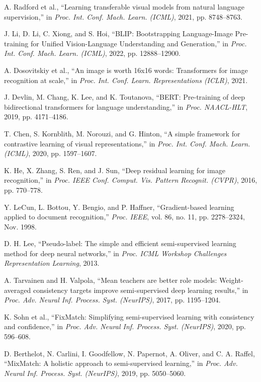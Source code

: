 \documentclass{ieeeaccess}
\begin{document}
\begin{thebibliography}{00}
 A. Radford et al., ``Learning transferable visual models from natural language supervision,'' in \emph{Proc. Int. Conf. Mach. Learn. (ICML)}, 2021, pp. 8748--8763.

 J. Li, D. Li, C. Xiong, and S. Hoi, ``BLIP: Bootstrapping Language-Image Pre-training for Unified Vision-Language Understanding and Generation,'' in \emph{Proc. Int. Conf. Mach. Learn. (ICML)}, 2022, pp. 12888--12900.

 A. Dosovitskiy et al., ``An image is worth 16x16 words: Transformers for image recognition at scale,'' in \emph{Proc. Int. Conf. Learn. Representations (ICLR)}, 2021.

 J. Devlin, M. Chang, K. Lee, and K. Toutanova, ``BERT: Pre-training of deep bidirectional transformers for language understanding,'' in \emph{Proc. NAACL-HLT}, 2019, pp. 4171--4186.

 T. Chen, S. Kornblith, M. Norouzi, and G. Hinton, ``A simple framework for contrastive learning of visual representations,'' in \emph{Proc. Int. Conf. Mach. Learn. (ICML)}, 2020, pp. 1597--1607.

 K. He, X. Zhang, S. Ren, and J. Sun, ``Deep residual learning for image recognition,'' in \emph{Proc. IEEE Conf. Comput. Vis. Pattern Recognit. (CVPR)}, 2016, pp. 770--778.

 Y. LeCun, L. Bottou, Y. Bengio, and P. Haffner, ``Gradient-based learning applied to document recognition,'' \emph{Proc. IEEE}, vol. 86, no. 11, pp. 2278--2324, Nov. 1998.

 D. H. Lee, ``Pseudo-label: The simple and efficient semi-supervised learning method for deep neural networks,'' in \emph{Proc. ICML Workshop Challenges Representation Learning}, 2013.

 A. Tarvainen and H. Valpola, ``Mean teachers are better role models: Weight-averaged consistency targets improve semi-supervised deep learning results,'' in \emph{Proc. Adv. Neural Inf. Process. Syst. (NeurIPS)}, 2017, pp. 1195--1204.

 K. Sohn et al., ``FixMatch: Simplifying semi-supervised learning with consistency and confidence,'' in \emph{Proc. Adv. Neural Inf. Process. Syst. (NeurIPS)}, 2020, pp. 596--608.

 D. Berthelot, N. Carlini, I. Goodfellow, N. Papernot, A. Oliver, and C. A. Raffel, ``MixMatch: A holistic approach to semi-supervised learning,'' in \emph{Proc. Adv. Neural Inf. Process. Syst. (NeurIPS)}, 2019, pp. 5050--5060.


\end{thebibliography}
\end{document}
